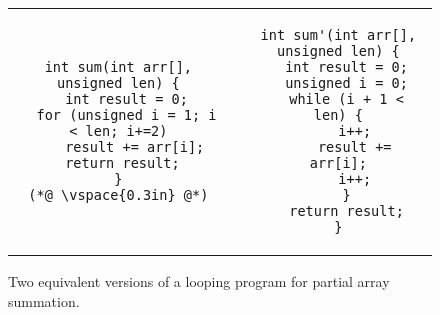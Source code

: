 \begin{figure}
\centering
\begin{tabular}{ccc}
\begin{lstlisting}
int sum(int arr[], unsigned len) {
  int result = 0;
  for (unsigned i = 1; i < len; i+=2)
    result += arr[i];
 return result;
}
(*@ \vspace{0.3in} @*)
\end{lstlisting}
&
\hspace{0.35in}
&
\begin{lstlisting}
int sum'(int arr[], unsigned len) {
  int result = 0;
  unsigned i = 0;
  while (i + 1 < len) {
    i++;
    result += arr[i];
    i++;
  }
  return result;
}
\end{lstlisting}
\end{tabular}
\caption{Two equivalent versions of a looping program for partial array summation.}
\end{figure}
